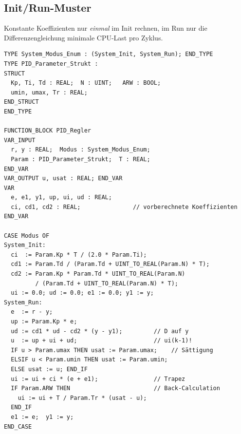 \subsection{Init/Run-Muster}
\label{sec:initrun}
Konstante Koeffizienten nur \emph{einmal} im Init rechnen, im Run nur die
Differenzengleichung \ra minimale CPU-Last pro Zyklus.
\begin{lstlisting}
TYPE System_Modus_Enum : (System_Init, System_Run); END_TYPE
TYPE PID_Parameter_Strukt :
STRUCT
  Kp, Ti, Td : REAL;  N : UINT;   ARW : BOOL;
  umin, umax, Tr : REAL;
END_STRUCT
END_TYPE

FUNCTION_BLOCK PID_Regler
VAR_INPUT
  r, y : REAL;  Modus : System_Modus_Enum;
  Param : PID_Parameter_Strukt;  T : REAL;
END_VAR
VAR_OUTPUT u, usat : REAL; END_VAR
VAR
  e, e1, y1, up, ui, ud : REAL;
  ci, cd1, cd2 : REAL;               // vorberechnete Koeffizienten
END_VAR

CASE Modus OF
System_Init:
  ci  := Param.Kp * T / (2.0 * Param.Ti);
  cd1 := Param.Td / (Param.Td + UINT_TO_REAL(Param.N) * T);
  cd2 := Param.Kp * Param.Td * UINT_TO_REAL(Param.N)
         / (Param.Td + UINT_TO_REAL(Param.N) * T);
  ui := 0.0; ud := 0.0; e1 := 0.0; y1 := y;
System_Run:
  e  := r - y;
  up := Param.Kp * e;
  ud := cd1 * ud - cd2 * (y - y1);         // D auf y
  u  := up + ui + ud;                      // ui(k-1)!
  IF u > Param.umax THEN usat := Param.umax;    // Sättigung
  ELSIF u < Param.umin THEN usat := Param.umin;
  ELSE usat := u; END_IF
  ui := ui + ci * (e + e1);                // Trapez
  IF Param.ARW THEN                        // Back-Calculation
    ui := ui + T / Param.Tr * (usat - u);
  END_IF
  e1 := e;  y1 := y;
END_CASE
\end{lstlisting}

